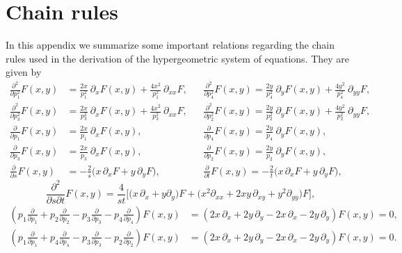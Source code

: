 \documentclass[a4paper,11pt,openright,twoside]{book}
\numberwithin{equation}{section}
\begin{document}
{{\section{Chain rules}\label{Appendix0}
In this appendix we summarize some important relations regarding the chain rules used in the derivation of the hypergeometric system of equations. They are given by
\begin{align}
	\frac{\partial^2}{\partial p_1^2} F(x,y)&=\frac{2x}{p_1^2}\ \partial_x F(x,y)+\frac{4x^2}{p_1^2}\ \partial_{xx}F,&& \frac{\partial^2}{\partial p_4^2} F(x,y)=\frac{2y}{p_4^2}\ \partial_y F(x,y)+\frac{4y^2}{p_4^2}\ \partial_{yy}F,\\[1.3ex]
	\frac{\partial^2}{\partial p_3^2} F(x,y)&=\frac{2x}{p_3^2}\ \partial_x F(x,y)+\frac{4x^2}{p_3^2}\ \partial_{xx}F,&& \frac{\partial^2}{\partial p_2^2} F(x,y)=\frac{2y}{p_2^2}\ \partial_y F(x,y)+\frac{4y^2}{p_2^2}\ \partial_{yy}F,\\[1.3ex]
	\frac{\partial}{\partial p_1} F(x,y)&=\frac{2x}{p_1} \ \partial_x F(x,y),&&\frac{\partial}{\partial p_4} F(x,y)=\frac{2y}{p_4} \ \partial_y F(x,y),\\[1.3ex]
	\frac{\partial}{\partial p_3} F(x,y)&=\frac{2x}{p_3} \ \partial_x F(x,y),&&\frac{\partial}{\partial p_2} F(x,y)=\frac{2y}{p_2} \ \partial_y F(x,y),\\[1.3ex]
	\frac{\partial}{\partial s}F(x,y)&=-\frac{2}{s}\big(x\,\partial_x F+y\,\partial_yF\big),&&\frac{\partial}{\partial t}F(x,y)=-\frac{2}{t}\big(x\,\partial_x F+y\,\partial_yF\big),
\end{align}
\begin{equation}
	\frac{\partial^2}{\partial s\partial t}F(x,y)=\frac{4}{st}\big[\big(
	x\,\partial_x +y\partial_y\big)F+\big(x^2\partial_{xx}+2xy\,\partial_{xy}+y^2\partial_{yy}\big)F\big],
\end{equation}
\begin{align}
	\left(p_1\frac{\partial}{\partial p_1}+p_2\frac{\partial}{\partial p_2}-p_3\frac{\partial}{\partial p_3}-p_4\frac{\partial}{\partial p_4}\right)F(x,y)&=\left(2x\,\partial_x+2y\,\partial_y -2x\,\partial_x-2y\,\partial_y\right)F(x,y)=0,\\[1.5ex]
	\left(p_1\frac{\partial}{\partial p_1}+p_4\frac{\partial}{\partial p_4}-p_3\frac{\partial}{\partial p_3}-p_2\frac{\partial}{\partial p_2}\right)F(x,y)&=\left(2x\,\partial_x+2y\,\partial_y -2x\,\partial_x-2y\,\partial_y\right)F(x,y)=0.
\end{align}

}}
\end{document}
